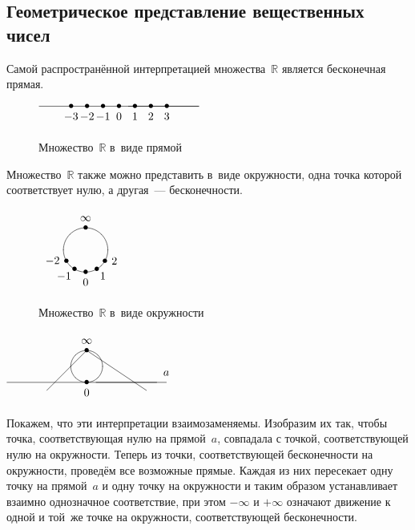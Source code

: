 \subsection{Геометрическое представление вещественных чисел}
Самой распространённой интерпретацией множества~$\mathbb R$ является бесконечная прямая.
\begin{figure}[h] \centering
\noindent
$\begin{xy} /r5mm/:
(0, 0) *{\bullet} *++!U{0};
(5, 0) **@{-};
(-5, 0) **@{-};
(1, 0) *{\bullet} *++!U{1};
(2, 0) *{\bullet} *++!U{2};
(3, 0) *{\bullet} *++!U{3};
(-1, 0) *{\bullet} *++!U{-1};
(-2, 0) *{\bullet} *++!U{-2};
(-3, 0) *{\bullet} *++!U{-3};
\end{xy}$
\caption{Множество~$\mathbb R$ в~виде прямой}
\end{figure}

Множество~$\mathbb R$ также можно представить в~виде окружности, одна точка которой соответствует нулю, а другая~--- бесконечности.
\begin{figure}[h] \centering
\noindent
$\begin{xy} /r7mm/:
(0, 0) *\cir<7mm>{};
(-0.8660, -0.5) *{\bullet} *++!R{-2};
(-0.5, -0.8660) *{\bullet} *+!UR{-1};
(0, -1) *{\bullet} *++!U{0};
(0.5, -0.8660) *{\bullet} *+!UL{1};
(0.8660, -0.5) *{\bullet} *++!L{2};
(0, 1) *{\bullet} *++!D{\infty};
\end{xy}$
\caption{Множество~$\mathbb R$ в~виде окружности}
\end{figure}

\begin{floatingfigure}[r]{54mm}
\noindent
$\begin{xy} /r5mm/:
(0, 0) *{\bullet} *++!U{0};
(5, 0) **@{-} *++!D{a};
(-5, 0) **@{-};
(0, 1) *\cir<5mm>{};
(0, 2) = "inf" *{\bullet} *++!D{\infty};
(3.75, -0.5) **@{-};
"inf"; (-2.5, -0.5) **@{-};
\end{xy}$
\end{floatingfigure}
Покажем, что эти интерпретации взаимозаменяемы.
Изобразим их так, чтобы точка, соответствующая нулю на прямой~$a$, совпадала с точкой, соответствующей нулю на окружности.
Теперь из точки, соответствующей бесконечности на окружности, проведём все возможные прямые.
Каждая из них пересекает одну точку на прямой~$a$ и одну точку на окружности и таким образом устанавливает взаимно однозначное соответствие, при этом $-\infty$ и $+\infty$ означают движение к одной и той~же точке на окружности, соответствующей бесконечности.